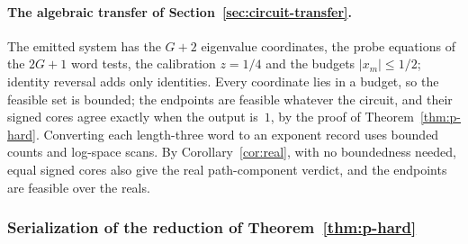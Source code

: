 \paragraph{The algebraic transfer of Section~\ref{sec:circuit-transfer}.}
The emitted system has the $G+2$ eigenvalue coordinates, the probe equations
of the $2G+1$ word tests, the calibration $z=1/4$ and the budgets
$|x_m|\le1/2$; identity reversal adds only identities. Every coordinate
lies in a budget, so the feasible set is bounded; the endpoints are
feasible whatever the circuit, and their signed cores agree exactly when
the output is~$1$, by the proof of Theorem~\ref{thm:p-hard}. Converting each length-three word to an exponent record uses
bounded counts and log-space scans. By Corollary~\ref{cor:real}, with no
boundedness needed, equal signed cores also give the real path-component
verdict, and the endpoints are feasible over the reals.

\subsubsection{Serialization of the reduction of Theorem~\ref{thm:p-hard}}\label{app:serialization}

